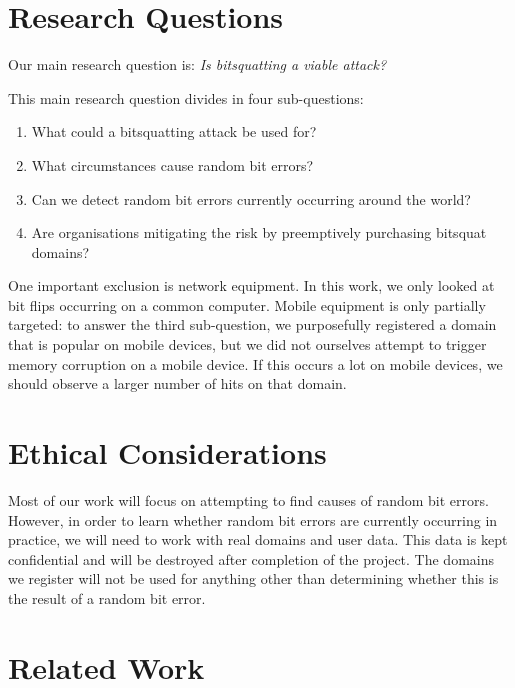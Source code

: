 \documentclass[conference]{IEEEtran}
\begin{document}
\section{Research Questions}\label{sec:researchq}

Our main research question is:
{\it Is bitsquatting a viable attack?}

\vspace{0.1cm}

\noindent{} This main research question divides in four sub-questions:

\begin{enumerate}
    \item What could a bitsquatting attack be used for?
	\item What circumstances cause random bit errors?
	\item Can we detect random bit errors currently occurring around the world?
	\item Are organisations mitigating the risk by preemptively purchasing
	      bitsquat domains?
\end{enumerate}

One important exclusion is network equipment. In this work, we only looked at
bit flips occurring on a common computer. Mobile equipment is only partially
targeted: to answer the third sub-question, we purposefully registered a domain
that is popular on mobile devices, but we did not ourselves attempt to trigger
memory corruption on a mobile device. If this occurs a lot on mobile devices,
we should observe a larger number of hits on that domain.


\section{Ethical Considerations}\label{sec:ethics}

Most of our work will focus on attempting to find causes of random bit errors.
However, in order to learn whether random bit errors are currently occurring in
practice, we will need to work with real domains and user data. This data is
kept confidential and will be destroyed after completion of the project. The
domains we register will not be used for anything other than determining
whether this is the result of a random bit error.


\section{Related Work}\label{sec:relwork}
\end{document}
